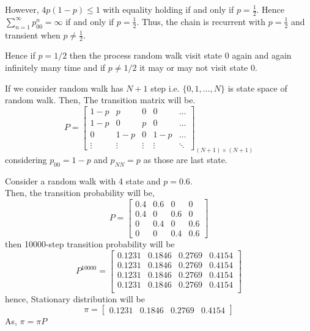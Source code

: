 However, $ 4p(1-p)\le 1 $ with equality holding if and only if $ p=\frac{1}{2} $. Hence $ \sum_{n=1}^{\infty} p^{n}_{00}=\infty $ 
if and only if $ p=\frac{1}{2} $. Thus, the chain is recurrent with $ p=\frac{1}{2} $ and transient when  $ p\neq \frac{1}{2} $.

Hence if $ p= 1/2 $ then the process random walk visit state 0 again and again infinitely many time and if  $ p \neq 1/2 $ it may or may 
not visit state 0.

If we consider random walk has  $ N+1 $ step i.e.  $ \{0,1,\ldots,N\} $ is state space of random walk.
Then, The transition matrix will be.
\[
    P = 
    \begin{bmatrix}
        1-p & p & 0 & 0 & \ldots\\ 
        1-p & 0 & p & 0 & \ldots\\ 
        0 & 1-p & 0 & 1-p & \ldots\\ 
        \vdots & \vdots & \vdots & \vdots & \ddots
    \end{bmatrix}_{(N+1)\times(N+1)}
\]
considering $ p_{00} = 1-p $ and $ p_{N N} = p $ as those are last state.

\begin{example}
    Consider a random walk with 4 state and $ p = 0.6 $.\\ 
    Then, the transition probability will be,
    \[
        P = 
        \begin{bmatrix}
            0.4 & 0.6 & 0 & 0\\ 
            0.4 & 0 & 0.6 & 0\\ 
            0 & 0.4 & 0 & 0.6\\ 
            0 & 0 & 0.4 & 0.6
        \end{bmatrix} 
    \]
    then 10000-step transition probability will be
    \[
        P^{10000}=
        \begin{bmatrix}
            0.1231 & 0.1846 & 0.2769 & 0.4154 \\
            0.1231 & 0.1846 & 0.2769 & 0.4154 \\
            0.1231 & 0.1846 & 0.2769 & 0.4154 \\
            0.1231 & 0.1846 & 0.2769 & 0.4154 \\
        \end{bmatrix}
    \]
    hence, Stationary distribution will be 
    \[
        \pi = 
        \begin{bmatrix}
            0.1231 &   0.1846  &  0.2769  &  0.4154
        \end{bmatrix} 
    \]
    As, $ \pi = \pi P $
\end{example}


